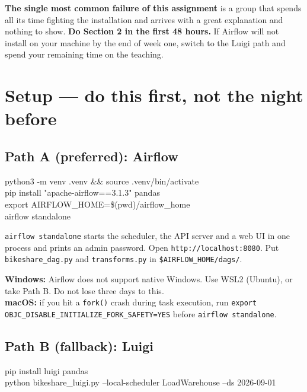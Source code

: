 \documentclass[11pt]{article}
\newcommand{\key}[1]{\textcolor{accent}{\textbf{#1}}}
\begin{document}
\begin{warnbox}
\textbf{The single most common failure of this assignment} is a group that
spends all its time fighting the installation and arrives with a great
explanation and nothing to show. \key{Do Section 2 in the first 48 hours.}
If Airflow will not install on your machine by the end of week one, switch to
the Luigi path and spend your remaining time on the teaching.
\end{warnbox}

\section{Setup --- do this first, not the night before}

\subsection*{Path A (preferred): Airflow}

\begin{codebox}
python3 -m venv .venv \&\& source .venv/bin/activate\\
pip install "apache-airflow==3.1.3" pandas\\
export AIRFLOW\_HOME=\$(pwd)/airflow\_home\\
airflow standalone
\end{codebox}

\noindent
\texttt{airflow standalone} starts the scheduler, the API server and a web UI
in one process and prints an admin password. Open
\texttt{http://localhost:8080}. Put \texttt{bikeshare\_dag.py} and
\texttt{transforms.py} in \texttt{\$AIRFLOW\_HOME/dags/}.

\begin{warnbox}
\textbf{Windows:} Airflow does not support native Windows. Use WSL2 (Ubuntu),
or take Path B. Do not lose three days to this.\\[3pt]
\textbf{macOS:} if you hit a \texttt{fork()} crash during task execution, run
\texttt{export OBJC\_DISABLE\_INITIALIZE\_FORK\_SAFETY=YES} before
\texttt{airflow standalone}.
\end{warnbox}

\subsection*{Path B (fallback): Luigi}

\begin{codebox}
pip install luigi pandas\\
python bikeshare\_luigi.py --local-scheduler LoadWarehouse --ds 2026-09-01
\end{codebox}
\end{document}
